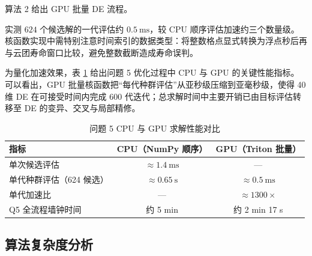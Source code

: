 \documentclass[11pt,a4paper]{ctexart}
\begin{document}
算法 2 给出 GPU 批量 DE 流程。

\begin{algorithm}[H]
\caption{GPU 批量差分进化（Q5）}
\label{alg:gpude}
\end{algorithm}

实测 $624$ 个候选解的一代评估约 $0.5~\mathrm{ms}$，较 CPU 顺序评估加速约三个数量级。核函数实现中需特别注意时间索引的数据类型：将整数格点显式转换为浮点秒后再与云团寿命窗口比较，避免整数截断造成寿命误判。

为量化加速效果，表 \ref{tab:perf} 给出问题 5 优化过程中 CPU 与 GPU 的关键性能指标。可以看出，GPU 批量核函数把“每代种群评估”从亚秒级压缩到亚毫秒级，使得 40 维 DE 在可接受时间内完成 600 代迭代；总求解时间中主要开销已由目标评估转移至 DE 的变异、交叉与局部精修。

\begin{table}[H]
\centering
\caption{问题 5 CPU 与 GPU 求解性能对比}
\label{tab:perf}
\small
\begin{tabular}{lcc}
\toprule
指标 & CPU（NumPy 顺序） & GPU（Triton 批量） \\
\midrule
单次候选评估 & $\approx 1.4~\mathrm{ms}$ & --- \\
单代种群评估（624 候选） & $\approx 0.65~\mathrm{s}$ & $\approx 0.5~\mathrm{ms}$ \\
单代加速比 & --- & $\approx 1300\times$ \\
Q5 全流程墙钟时间 & 约 5 min & 约 2 min 17 s \\
\bottomrule
\end{tabular}
\end{table}

\subsection{算法复杂度分析}
\end{document}
